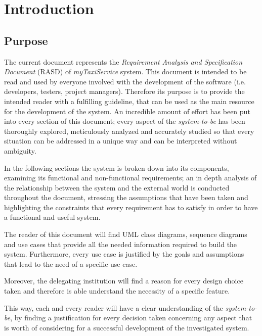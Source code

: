 \documentclass[12pt, a4paper]{article}
\begin{document}
\section{Introduction}

\subsection{Purpose}

The current document represents the \emph{Requirement Analysis and Specification Document} (RASD) of \emph{myTaxiService} system.
This document is intended to be read and used by everyone involved with the development of the software (i.e. developers, testers, project managers). Therefore its purpose is to provide the intended reader with a fulfilling guideline, that can be used as the main resource for the development of the system.
An incredible amount of effort has been put into every section of this document; every aspect of the \emph{system-to-be} has been thoroughly explored, meticulously analyzed and accurately studied so that every situation can be addressed in a unique way and can be interpreted without ambiguity.

In the following sections the system is broken down into its components, examining its functional and non-functional requirements; an in depth analysis of the relationship between the system and the external world is conducted throughout the document, stressing the assumptions that have been taken and highlighting the constraints that every requirement has to satisfy in order to have a functional and useful system.


The reader of this document will find UML class diagrams, sequence diagrams and use cases that provide all the needed information required to build the system.
Furthermore, every use case is justified by the goals and assumptions that lead to the need of a specific use case.

Moreover, the delegating institution will find a reason for every design choice taken and therefore is able understand the necessity of a specific feature.

This way, each and every reader will have a clear understanding of the \emph{system-to-be}, by finding a justification for every decision taken concerning any aspect that is worth of considering for a successful development of the investigated system.
\end{document}
